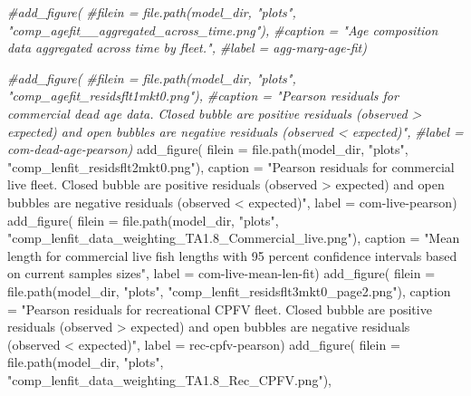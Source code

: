 \documentclass[
  letterpaper,
]{article}
\newenvironment{Shaded}{\begin{snugshade}}{\end{snugshade}}
\newcommand{\AttributeTok}[1]{\textcolor[rgb]{0.77,0.63,0.00}{#1}}
\newcommand{\CommentTok}[1]{\textcolor[rgb]{0.56,0.35,0.01}{\textit{#1}}}
\newcommand{\FunctionTok}[1]{\textcolor[rgb]{0.00,0.00,0.00}{#1}}
\newcommand{\NormalTok}[1]{#1}
\newcommand{\StringTok}[1]{\textcolor[rgb]{0.31,0.60,0.02}{#1}}
\begin{document}
\begin{Shaded}
\begin{Highlighting}[]
\CommentTok{\#add\_figure(}
\CommentTok{\#filein = file.path(model\_dir, "plots", "comp\_agefit\_\_aggregated\_across\_time.png"), }
\CommentTok{\#caption = "Age composition data aggregated across time by fleet.",}
\CommentTok{\#label = \textquotesingle{}agg{-}marg{-}age{-}fit\textquotesingle{})}

\CommentTok{\#add\_figure(}
\CommentTok{\#filein = file.path(model\_dir, "plots", "comp\_agefit\_residsflt1mkt0.png"), }
\CommentTok{\#caption = "Pearson residuals for commercial dead age data. Closed bubble are positive residuals (observed \textgreater{} expected) and open bubbles are negative residuals (observed \textless{} expected)",}
\CommentTok{\#label = \textquotesingle{}com{-}dead{-}age{-}pearson\textquotesingle{})}
\FunctionTok{add\_figure}\NormalTok{(}
\AttributeTok{filein =} \FunctionTok{file.path}\NormalTok{(model\_dir, }\StringTok{"plots"}\NormalTok{, }\StringTok{"comp\_lenfit\_residsflt2mkt0.png"}\NormalTok{), }
\AttributeTok{caption =} \StringTok{"Pearson residuals for commercial live fleet. Closed bubble are positive residuals (observed \textgreater{} expected) and open bubbles are negative residuals (observed \textless{} expected)"}\NormalTok{,}
\AttributeTok{label =} \StringTok{\textquotesingle{}com{-}live{-}pearson\textquotesingle{}}\NormalTok{)}
\FunctionTok{add\_figure}\NormalTok{(}
\AttributeTok{filein =} \FunctionTok{file.path}\NormalTok{(model\_dir, }\StringTok{"plots"}\NormalTok{, }\StringTok{"comp\_lenfit\_data\_weighting\_TA1.8\_Commercial\_live.png"}\NormalTok{), }
\AttributeTok{caption =} \StringTok{"Mean length for commercial live fish lengths with 95 percent confidence intervals based on current samples sizes"}\NormalTok{,}
\AttributeTok{label =} \StringTok{\textquotesingle{}com{-}live{-}mean{-}len{-}fit\textquotesingle{}}\NormalTok{)}
\FunctionTok{add\_figure}\NormalTok{(}
\AttributeTok{filein =} \FunctionTok{file.path}\NormalTok{(model\_dir, }\StringTok{"plots"}\NormalTok{, }\StringTok{"comp\_lenfit\_residsflt3mkt0\_page2.png"}\NormalTok{), }
\AttributeTok{caption =} \StringTok{"Pearson residuals for recreational CPFV fleet. Closed bubble are positive residuals (observed \textgreater{} expected) and open bubbles are negative residuals (observed \textless{} expected)"}\NormalTok{,}
\AttributeTok{label =} \StringTok{\textquotesingle{}rec{-}cpfv{-}pearson\textquotesingle{}}\NormalTok{)}
\FunctionTok{add\_figure}\NormalTok{(}
\AttributeTok{filein =} \FunctionTok{file.path}\NormalTok{(model\_dir, }\StringTok{"plots"}\NormalTok{, }\StringTok{"comp\_lenfit\_data\_weighting\_TA1.8\_Rec\_CPFV.png"}\NormalTok{), }

\end{Highlighting}
\end{Shaded}
\end{document}
